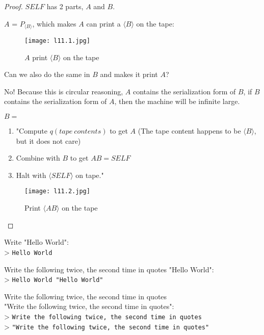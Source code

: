 \begin{proof}
    \(SELF\) has 2 parts, \(A\) and \(B\). 

    \(A\) = \(P_{\langle B \rangle}\), which makes \(A\) can print a \(\langle B \rangle\) on the tape:

    \begin{figure}[H]
        \centering
        \texttt{[image: l11.1.jpg]}
        \caption{\(A\) print \(\langle B \rangle\) on the tape}
    \end{figure}

    \begin{intuition}
        Can we also do the same in \(B\) and makes it print \(A\)? 

        No! Because this is circular reasoning, \(A\) contains the serialization form of \(B\), if \(B\) contains the serialization form of \(A\), then the machine will be infinite large.
    \end{intuition}

    \(B =\) \begin{enumerate}
        \item "Compute \(q(tape \:contents)\)  to get \(A\) (The tape content happens to be \(\langle B \rangle\), but it does not care) 
        \item Combine with \(B\) to get \(AB = SELF\)
        \item Halt with \(\langle SELF \rangle\) on tape."   
    \end{enumerate} 

    \begin{figure}[H]
        \centering
        \texttt{[image: l11.2.jpg]}
        \caption{Print \(\langle AB \rangle\) on the tape}
    \end{figure}
\end{proof}

\begin{example}
    Write "Hello World":\\
    > \verb|Hello World|

    Write the following twice, the second time in quotes "Hello World":\\
    > \verb|Hello World "Hello World"|

    Write the following twice, the second time in quotes\\
    "Write the following twice, the second time in quotes":\\
    > \verb|Write the following twice, the second time in quotes|\\
    > \verb|"Write the following twice, the second time in quotes"|
\end{example}

